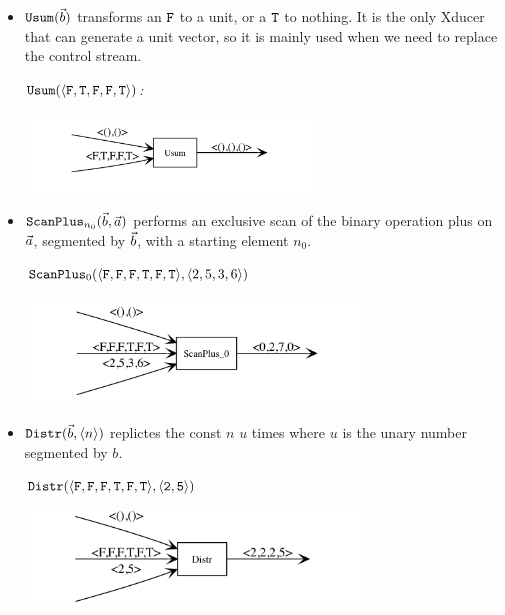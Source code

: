 \begin{itemize}
	\item $\mathtt{Usum}(\vec b)$ transforms an $\mathtt{F}$ to a unit, or a $\mathtt{T}$ to nothing. It is the only Xducer that can generate a unit vector,
	so it is mainly used when we need to replace the control stream.
	\begin{example} \emph{$\usumf{\<\F,\T,\F,\F,\T\'>}$:}\\
		\begin{center}
			\includegraphics[width=0.6\textwidth]{fig/usum.png}
		\end{center}
	\end{example}
	
	\item $\mathtt{ScanPlus}_{n_0}(\vec b,\vec a)$ performs an exclusive scan of the binary operation plus on $\vec a$, segmented by $\vec b$, with a starting element $n_0$.
		\begin{example} \emph{$\scan_{0}(\<\F,\F,\F,\T,\F,\T\'>, \< 2,5,3,6 \'>)$}\\
		\begin{center}
			\includegraphics[width=0.7\textwidth]{fig/scan.png}
		\end{center}
	\end{example}
	 
	\item $\mathtt{Distr}(\vec b,{\langle n \rangle})$ replictes the const $n$ $u$ times where $u$ is the unary number segmented by $b$. 
	\begin{example} \emph{$\distrf{\<\F,\F,\F,\T,\F,\T\'>}{\< 2,5 \'>}$}\\
		\begin{center}
			\includegraphics[width=0.7\textwidth]{fig/distr.png}
		\end{center}
	\end{example}
	
\end{itemize}

